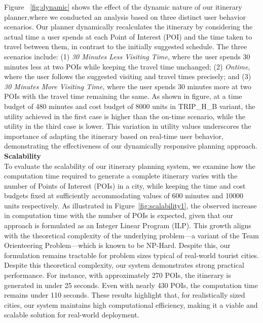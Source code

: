 Figure ~\ref{fig:dynamic} shows the effect of the dynamic nature of our itinerary planner,where we conducted an analysis based on three distinct user behavior scenarios. Our planner dynamically recalculates the itinerary by considering the actual time a user spends at each Point of Interest (POI) and the time taken to travel between them, in contrast to the initially suggested schedule. The three scenarios include: (1) \textit{30 Minutes Less Visiting Time}, where the user spends 30 minutes less at two POIs while keeping the travel time unchanged; (2) \textit{Ontime}, where the user follows the suggested visiting and travel times precisely; and (3) \textit{30 Minutes More Visiting Time}, where the user spends 30 minutes more at two POIs with the travel time remaining the same. As shown in figure, at a time budget of 480 minutes and cost budget of 8000 units in TRIP\_H\_B variant, the utility achieved in the first case is higher than the on-time scenario, while the utility in the third case is lower. This variation in utility values underscores the importance of adapting the itinerary based on real-time user behavior, demonstrating the effectiveness of our dynamically responsive planning approach.\\


\noindent\textbf{Scalability}\\
To evaluate the scalability of our itinerary planning system, we examine how the computation time required to generate a complete itinerary varies with the number of Points of Interest (POIs) in a city, while keeping the time and cost budgets fixed at sufficiently accommodating values of 600 minutes and 10000 units respectively. As illustrated in Figure~\ref{fig:scalability1}, the observed increase in computation time with the number of POIs is expected, given that our approach is formulated as an Integer Linear Program (ILP). This growth aligns with the theoretical complexity of the underlying problem—a variant of the Team Orienteering Problem—which is known to be NP-Hard. Despite this, our formulation remains tractable for problem sizes typical of real-world tourist cities. Despite this theoretical complexity, our system demonstrates strong practical performance. For instance, with approximately 270 POIs, the itinerary is generated in under 25 seconds. Even with nearly 430 POIs, the computation time remains under 110 seconds. These results highlight that, for realistically sized cities, our system maintains high computational efficiency, making it a viable and scalable solution for real-world deployment.

